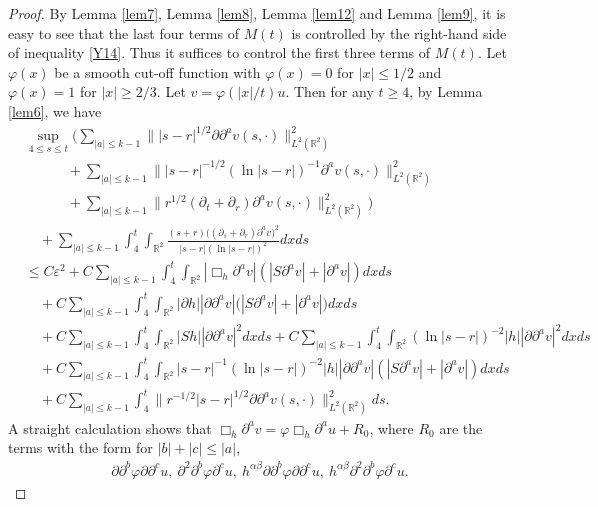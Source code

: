 \documentclass[11pt, reqno]{amsart}
\theoremstyle{definition}
\theoremstyle{remark}
\theoremstyle{definition}
\numberwithin{equation}{section}
\numberwithin{equation}{section}
\def\leq{\leqslant}
\def\geq{\geqslant}
\begin{document}
\begin{proof}
By Lemma \ref{lem7}, Lemma \ref{lem8}, Lemma \ref{lem12} and Lemma \ref{lem9}, it is easy to see that the last
four terms of $M(t)$ is controlled by the right-hand side of
inequality \eqref{Y14}. Thus it suffices to control the first three
terms of $M(t)$. Let $\varphi(x)$ be a smooth cut-off function with
$\varphi(x)=0$ for $|x|\leq 1/2$ and $\varphi(x)=1$ for
$|x|\geq2/3$. Let $v=\varphi(|x|/t) u$. Then for any $t\geq4$, by
Lemma \ref{lem6}, we have
\begin{align}\label{Y32}
&\sup_{4\leq s\leq t}\Big(\sum_{|a|\leq k-1}\||s-r|^{1/2}\partial\partial^av(s,\cdot)\|^2_{L^2(\mathbb R^2)}
\nonumber\\&\qquad\quad+\sum_{|a|\leq
k-1}\||s-r|^{-1/2}(\ln|s-r|)^{-1}\partial^av(s,\cdot)\|^2_{L^2(\mathbb
R^2)}\nonumber\\&\qquad\quad+\sum_{|a|\leq k-1}\|r^{1/2}(\partial_t+\partial_r)\partial^av(s,\cdot)\|^2_{L^2(\mathbb R^2)}\Big)\nonumber\\&\quad+\sum_{|a|\leq 
k-1}\int_4^t\int_{\mathbb
R^2}\frac{(s+r)\big((\partial_s+\partial_r)\partial^av\big)^2}{|s-r|(\ln|s-r|)^2}dxds
\nonumber\\&\leq C\varepsilon^2+C\sum_{|a|\leq
k-1}\int_4^t\int_{\mathbb R^2}|\Box_h\partial^av|
(|S\partial^av|+|\partial^av|)dxds \nonumber\\&\quad+C\sum_{|a|\leq
k-1}\int_4^t\int_{\mathbb R^2}|\partial h||\partial
\partial^av|\big(|S\partial^av|+|\partial^av|\big)dxds
\nonumber\\&\quad+C\sum_{|a|\leq k-1}\int_4^t\int_{\mathbb
R^2}|Sh||\partial \partial^av|^2dxds +C\sum_{|a|\leq
k-1}\int_4^t\int_{\mathbb
R^2}(\ln|s-r|)^{-2}|h||\partial\partial^av|^2dxds
\nonumber\\&\quad+C\sum_{|a|\leq k-1}\int_4^t\int_{\mathbb
R^2}|s-r|^{-1}(\ln|s-r|)^{-2}|h||\partial\partial^a
v|(|S\partial^av|+|\partial^av|)dxds
\nonumber\\&\quad+C\sum_{|a|\leq
k-1}\int_4^t\|r^{-1/2}|s-r|^{1/2}\partial\partial^av(s,\cdot)\|^2_{L^2(\mathbb
R^2)}ds.
\end{align}
A straight calculation shows that $\Box_h\partial^av=\varphi\Box_h\partial^au+R_0$, where $R_0$ are the terms with the form for $|b|+|c|\leq |a|$,
\begin{align*}
\partial\partial^b\varphi\partial\partial^cu,\ \partial^2\partial^b\varphi\partial^cu,\ h^{\alpha\beta}\partial\partial^b\varphi\partial\partial^cu,\ 
h^{\alpha\beta}\partial^2\partial^b\varphi\partial^cu.
\end{align*}

\end{proof}
\end{document}
